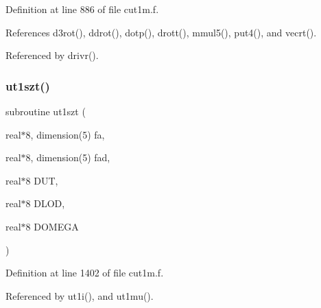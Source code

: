 Definition at line 886 of file cut1m.\+f.



References d3rot(), ddrot(), dotp(), drott(), mmul5(), put4(), and vecrt().



Referenced by drivr().

\mbox{\label{cut1m_8f_a838224410c242c01aa2cbbabe557347e}} 
\subsubsection{\texorpdfstring{ut1szt()}{ut1szt()}}
{\footnotesize\ttfamily subroutine ut1szt (\begin{DoxyParamCaption}\item[{real$\ast$8, dimension(5)}]{fa,  }\item[{real$\ast$8, dimension(5)}]{fad,  }\item[{real$\ast$8}]{D\+UT,  }\item[{real$\ast$8}]{D\+L\+OD,  }\item[{real$\ast$8}]{D\+O\+M\+E\+GA }\end{DoxyParamCaption})}



Definition at line 1402 of file cut1m.\+f.



Referenced by ut1i(), and ut1mu().


